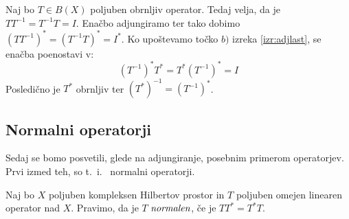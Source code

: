 \documentclass[mat2]{matdelo}
\newcommand{\pojem}[1]{\ensuremath{\emph{#1}}}
\begin{document}
			\begin{dokaz}
				Naj bo $T\in B(X)$ poljuben obrnljiv operator. Tedaj velja, da je $TT^{-1} = T^{-1}T = I$. Enačbo adjungiramo ter tako dobimo $(TT^{-1})^* = (T^{-1}T)^* = I^*$. Ko upoštevamo točko $b)$ izreka \ref{izr:adjlast}, se enačba poenostavi v: $$(T^{-1})^*T^* = T^*(T^{-1})^* = I$$
				Posledično je $T^*$ obrnljiv ter $(T^*)^{-1} = (T^{-1})^*$.
			\end{dokaz}
		\subsection{Normalni operatorji}
			Sedaj se bomo posvetili, glede na adjungiranje, posebnim primerom operatorjev. Prvi izmed teh, so t.~i.~ normalni operatorji.
			\begin{definicija}
				\label{def:normalop}
				Naj bo $X$ poljuben kompleksen Hilbertov prostor in $T$ poljuben omejen linearen operator nad $X$. Pravimo, da je $T$ \pojem{normalen}, če je $TT^* = T^*T$.
			\end{definicija}
			
\end{document}
